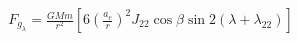 \documentclass[10pt]{article}
\begin{document}
\begin{align*}F_{g_{\lambda}}
= \frac{GMm}{r^2} 
\left[ 
6 \left( \frac{a_{e}}{r} \right)^2 J_{22}  \cos \beta \sin 2 \left( \lambda + \lambda_{22} \right)
\right]\end{align*}
\end{document}
